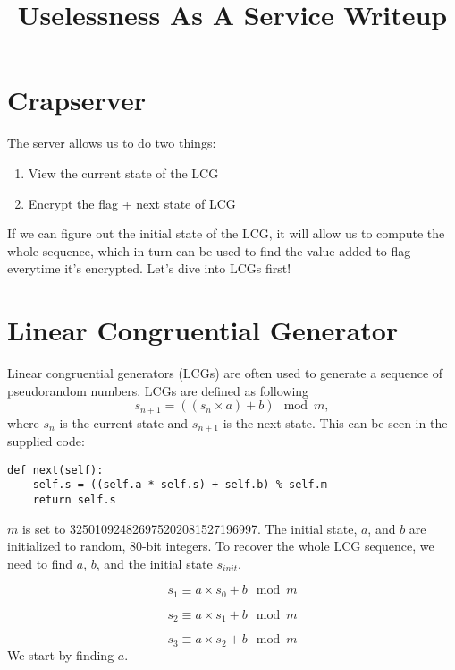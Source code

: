 \documentclass[12pt]{article}
\title{Uselessness As A Service Writeup}
\begin{document}
\maketitle

\section{Crapserver}
The server allows us to do two things:

\begin{enumerate}
	\item View the current state of the LCG
	\item Encrypt the flag + next state of LCG
\end{enumerate}
If we can figure out the initial state of the LCG, it will allow us to compute the whole sequence, which in turn can be used to find the value added to flag everytime it's encrypted. Let's dive into LCGs first!

\section{Linear Congruential Generator}
Linear congruential generators (LCGs) are often used to generate a sequence of pseudorandom numbers. LCGs are defined as following
\begin{equation}
	s_{n + 1} = ((s_{n} \times a) + b) \mod m,
\end{equation}
where $s_{n}$ is the current state and $s_{n + 1}$ is the next state. This can be seen in the supplied code:

\begin{verbatim}
def next(self):
	self.s = ((self.a * self.s) + self.b) % self.m
	return self.s
\end{verbatim}
$m$ is set to 325010924826975202081527196997. The initial state, $a$, and $b$ are initialized to random, 80-bit integers. To recover the whole LCG sequence, we need to find $a$, $b$, and the initial state $s_{init}$.

\begin{equation}
s_{1} \equiv a \times s_{0} + b \mod m
\end{equation}

\begin{equation}
s_{2} \equiv a \times s_{1} + b \mod m
\end{equation}

\begin{equation}
s_{3} \equiv a \times s_{2} + b \mod m
\end{equation}
We start by finding $a$.
\end{document}
